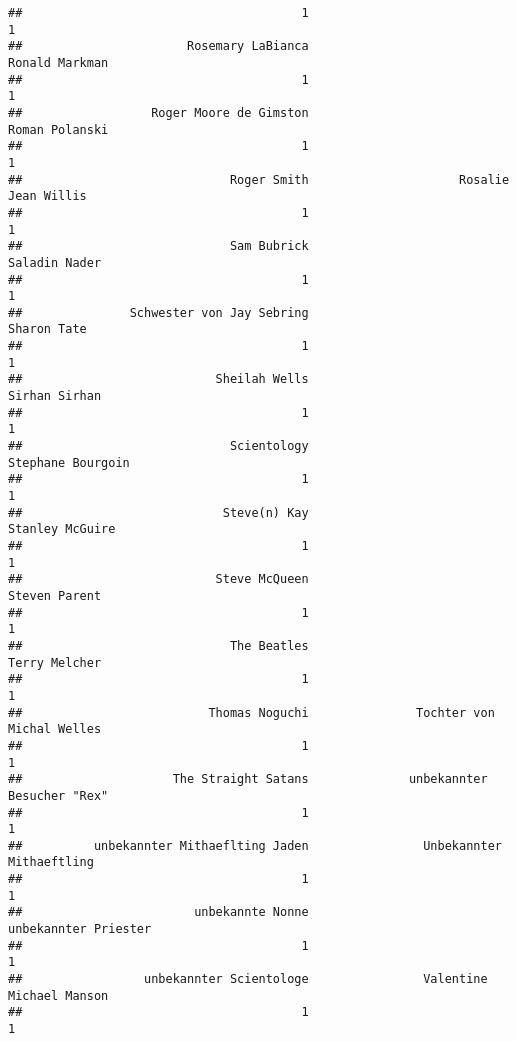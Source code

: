 \documentclass[
]{article}
\begin{document}
\begin{verbatim}
##                                       1                                       1 
##                       Rosemary LaBianca                          Ronald Markman 
##                                       1                                       1 
##                  Roger Moore de Gimston                          Roman Polanski 
##                                       1                                       1 
##                             Roger Smith                     Rosalie Jean Willis 
##                                       1                                       1 
##                             Sam Bubrick                           Saladin Nader 
##                                       1                                       1 
##               Schwester von Jay Sebring                             Sharon Tate 
##                                       1                                       1 
##                           Sheilah Wells                           Sirhan Sirhan 
##                                       1                                       1 
##                             Scientology                       Stephane Bourgoin 
##                                       1                                       1 
##                            Steve(n) Kay                         Stanley McGuire 
##                                       1                                       1 
##                           Steve McQueen                           Steven Parent 
##                                       1                                       1 
##                             The Beatles                           Terry Melcher 
##                                       1                                       1 
##                          Thomas Noguchi               Tochter von Michal Welles 
##                                       1                                       1 
##                     The Straight Satans              unbekannter Besucher "Rex" 
##                                       1                                       1 
##          unbekannter Mithaeflting Jaden                Unbekannter Mithaeftling 
##                                       1                                       1 
##                        unbekannte Nonne                    unbekannter Priester 
##                                       1                                       1 
##                 unbekannter Scientologe                Valentine Michael Manson 
##                                       1                                       1 

\end{verbatim}
\end{document}
